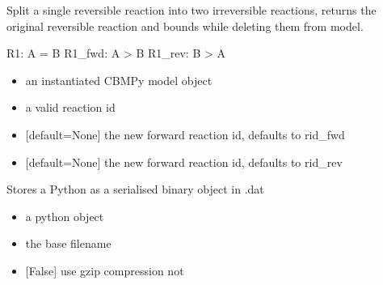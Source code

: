 \documentclass[letterpaper,10pt,english]{sphinxmanual}
\begin{document}
\begin{fulllineitems}
\label{\detokenize{modules_doc:cbmpy.CBTools.splitSingleReversibleReaction}}
\pysigstartsignatures
{}
\pysigstopsignatures
\sphinxAtStartPar
Split a single reversible reaction into two irreversible reactions, returns the original reversible reaction and bounds
while deleting them from model.

\sphinxAtStartPar
R1: A = B
R1\_fwd: A \sphinxhyphen{}\textgreater{} B
R1\_rev: B \sphinxhyphen{}\textgreater{} A
\begin{itemize}
\item {} 
\sphinxAtStartPar
{} an instantiated CBMPy model object

\item {} 
\sphinxAtStartPar
{} a valid reaction id

\item {} 
\sphinxAtStartPar
{} {[}default=None{]} the new forward reaction id, defaults to rid\_fwd

\item {} 
\sphinxAtStartPar
{} {[}default=None{]} the new forward reaction id, defaults to rid\_rev

\end{itemize}

\end{fulllineitems}


\begin{fulllineitems}
\label{\detokenize{modules_doc:cbmpy.CBTools.storeObj}}
\pysigstartsignatures
{}
\pysigstopsignatures
\sphinxAtStartPar
Stores a Python  as a serialised binary object in .dat
\begin{itemize}
\item {} 
\sphinxAtStartPar
{} a python object

\item {} 
\sphinxAtStartPar
{} the base filename

\item {} 
\sphinxAtStartPar
{} {[}False{]} use gzip compression not 

\end{itemize}

\end{fulllineitems}
\end{document}
